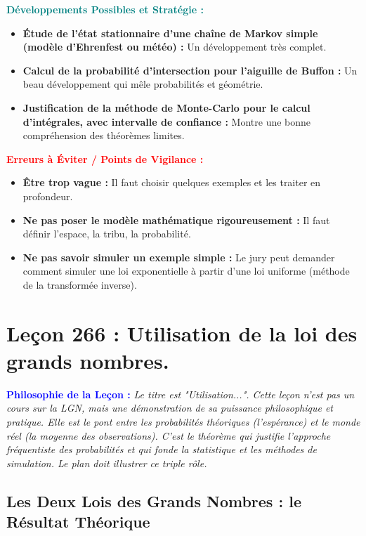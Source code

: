 \documentclass[12pt, a4paper, parskip=full]{report}
\theoremstyle{agregstyle}
\newenvironment{philosophie}
  {\par\medskip\noindent\begin{oframed}\noindent\textbf{\textcolor{blue}{Philosophie de la Leçon :}}\itshape}
  {\end{oframed}\par\medskip}
\newenvironment{developpements}
  {\par\medskip\noindent\begin{oframed}\noindent\textbf{\textcolor{teal}{Développements Possibles et Stratégie :}}}
  {\end{oframed}\par\medskip}
\newenvironment{erreurs}
  {\par\medskip\noindent\begin{oframed}\noindent\textbf{\textcolor{red}{Erreurs à Éviter / Points de Vigilance :}}}
  {\end{oframed}\par\medskip}
\begin{document}
\begin{developpements}
    \begin{itemize}
        \item \textbf{Étude de l'état stationnaire d'une chaîne de Markov simple (modèle d'Ehrenfest ou météo) :} Un développement très complet.
        \item \textbf{Calcul de la probabilité d'intersection pour l'aiguille de Buffon :} Un beau développement qui mêle probabilités et géométrie.
        \item \textbf{Justification de la méthode de Monte-Carlo pour le calcul d'intégrales, avec intervalle de confiance :} Montre une bonne compréhension des théorèmes limites.
    \end{itemize}
\end{developpements}

\begin{erreurs}
    \begin{itemize}
        \item \textbf{Être trop vague :} Il faut choisir quelques exemples et les traiter en profondeur.
        \item \textbf{Ne pas poser le modèle mathématique rigoureusement :} Il faut définir l'espace, la tribu, la probabilité.
        \item \textbf{Ne pas savoir simuler un exemple simple :} Le jury peut demander comment simuler une loi exponentielle à partir d'une loi uniforme (méthode de la transformée inverse).
    \end{itemize}
\end{erreurs}
\chapter{Leçon 266 : Utilisation de la loi des grands nombres.}

\begin{philosophie}
    Le titre est "Utilisation...". Cette leçon n'est pas un cours sur la LGN, mais une démonstration de sa puissance philosophique et pratique. Elle est le pont entre les probabilités théoriques (l'espérance) et le monde réel (la moyenne des observations). C'est le théorème qui justifie l'approche fréquentiste des probabilités et qui fonde la statistique et les méthodes de simulation. Le plan doit illustrer ce triple rôle.
\end{philosophie}

\section{Les Deux Lois des Grands Nombres : le Résultat Théorique}
\end{document}
